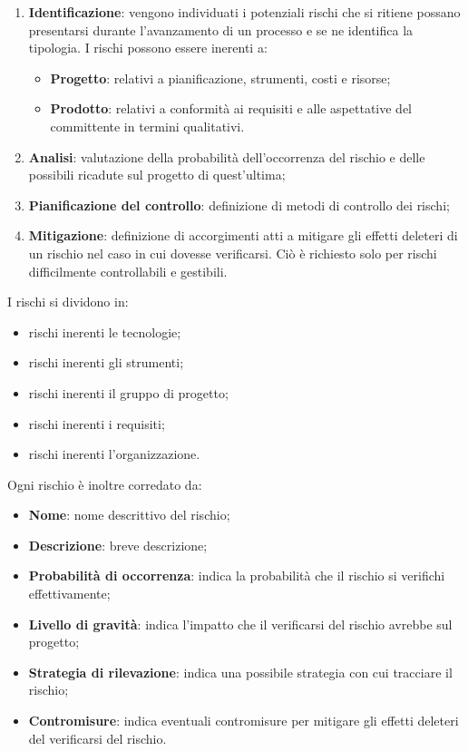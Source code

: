 \documentclass[../PianodiProgetto.tex]{subfiles}
\begin{document}
	\begin{enumerate}
		\item \textbf{Identificazione}: vengono individuati i potenziali rischi che si ritiene possano presentarsi durante
		l’avanzamento di un processo e se ne identifica la tipologia. I rischi possono essere inerenti a: 
		\begin{itemize}
			\item \textbf{Progetto}: relativi a pianificazione, strumenti, costi e risorse;
			\item \textbf{Prodotto}: relativi a conformità ai requisiti e alle aspettative del committente in termini qualitativi.
		\end{itemize}
		\item \textbf{Analisi}: valutazione della probabilità dell’occorrenza del rischio e delle possibili ricadute
		sul progetto di quest'ultima;
		\item \textbf{Pianificazione del controllo}: definizione di metodi di controllo dei rischi;
		\item \textbf{Mitigazione}: definizione di accorgimenti atti a mitigare gli effetti deleteri di un rischio nel caso in cui dovesse verificarsi. Ciò è richiesto solo per rischi
		difficilmente controllabili e gestibili.
	\end{enumerate}

	I rischi si dividono in:
		\begin{itemize}
			\item rischi inerenti le tecnologie;
			\item rischi inerenti gli strumenti;
			\item rischi inerenti il gruppo di progetto;
			\item rischi inerenti i requisiti;
			\item rischi inerenti l'organizzazione.
		\end{itemize}

	Ogni rischio è inoltre corredato da:
	
	\begin{itemize}
		\item \textbf{Nome}: nome descrittivo del rischio;
		\item \textbf{Descrizione}: breve descrizione;
		\item \textbf{Probabilità di occorrenza}: indica la probabilità che il rischio si verifichi effettivamente;
		\item \textbf{Livello di gravità}: indica l'impatto che il verificarsi del rischio avrebbe sul progetto;
		\item \textbf{Strategia di rilevazione}: indica una possibile strategia con cui tracciare il rischio;
		\item \textbf{Contromisure}: indica eventuali contromisure per mitigare gli effetti deleteri del verificarsi del rischio.
	\end{itemize}
	
\end{document}
